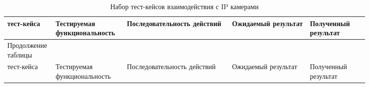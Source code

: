 \begin{longtable}{| >{\raggedright}m{0.06\linewidth} 
                  | >{\raggedright}m{0.18\linewidth} 
                  | >{\raggedright}m{0.27\linewidth} 
                  | >{\raggedright}m{0.2\linewidth} 
                  | >{\raggedright\arraybackslash}m{0.15\linewidth}|}
   \caption{Набор тест-кейсов взаимодействия с IP камерами} \label{table:testing:ip_cameras} \\

   \hline
   \No{} тест-кейса & Тестируемая функциональность & Последовательность действий & Ожидаемый результат & Полученный результат\\
   \endfirsthead

	\multicolumn{3}{@{} l}%
	{{Продолжение таблицы \thetable{}}} \\

	\hline
   	\No{} тест-кейса & Тестируемая функциональность & Последовательность действий & Ожидаемый результат & Полученный результат\\

	\hline 
	\endhead


\end{longtable}
